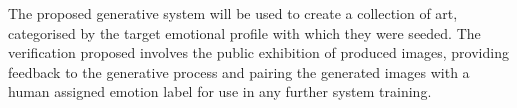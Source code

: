 \documentclass{article}
\begin{document}
The proposed generative system will be used to create a collection of art, categorised by the target emotional profile with which they were seeded.
The verification proposed involves the public exhibition of produced images, providing feedback to the generative process and pairing the generated images with a human assigned emotion label for use in any further system training.




\end{document}
